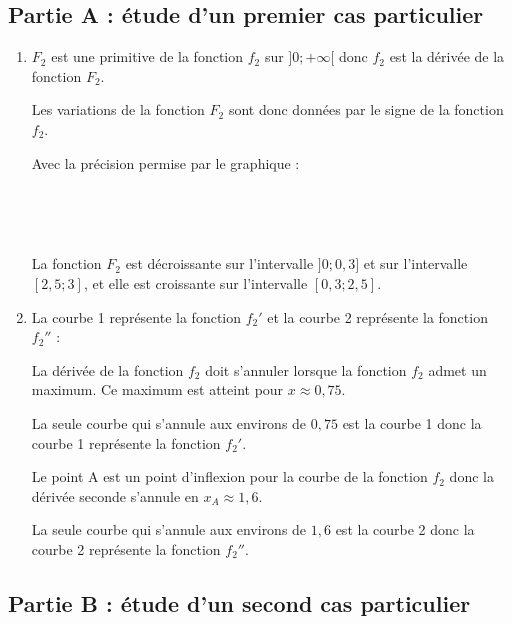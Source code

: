 \subsection*{Partie A : étude d'un premier cas particulier}

\begin{enumerate}
	\item 
	 $F_{2}$ est une primitive de la fonction $f_{2}$ sur $] 0 ;+\infty[$ donc $f_2$ est la dérivée de la fonction $F_{2}$. 
	 
	 Les variations de la fonction $F_2$ sont donc données par le signe de la fonction $f_2$. 
	 
	 
	 
	
	Avec la précision permise par le graphique : 
	
	
	
	
		\hfill~
	\hfill~
	
La fonction $F_{2}$ est décroissante sur  l'intervalle $]0;0,3]$ et sur l'intervalle $[2,5;3]$, et elle est  croissante sur l'intervalle $[0,3 ; 2,5]$.
	
	\item   La courbe   1  représente la fonction $f_{2}'$ et la courbe 2  représente la fonction $f_{2}''$ : 
	
	La dérivée de la fonction $f_2$ doit s'annuler lorsque la fonction $f_2$ admet un maximum. Ce maximum est atteint pour $x \approx 0,75$. 
	
	La seule courbe qui s'annule aux environs de $0,75$ est la courbe 1 donc la courbe 1 représente la fonction $f_2'$.
	
	Le point A est un point d'inflexion pour la courbe de la fonction $f_2$ donc la dérivée seconde s'annule en  $x_A \approx 1,6$. 
	
	 La seule courbe qui s'annule aux environs de $1,6$ est la courbe 2 donc la courbe 2 représente la fonction $f_2''$.

\end{enumerate}

\subsection*{Partie B : étude d'un second cas particulier}


